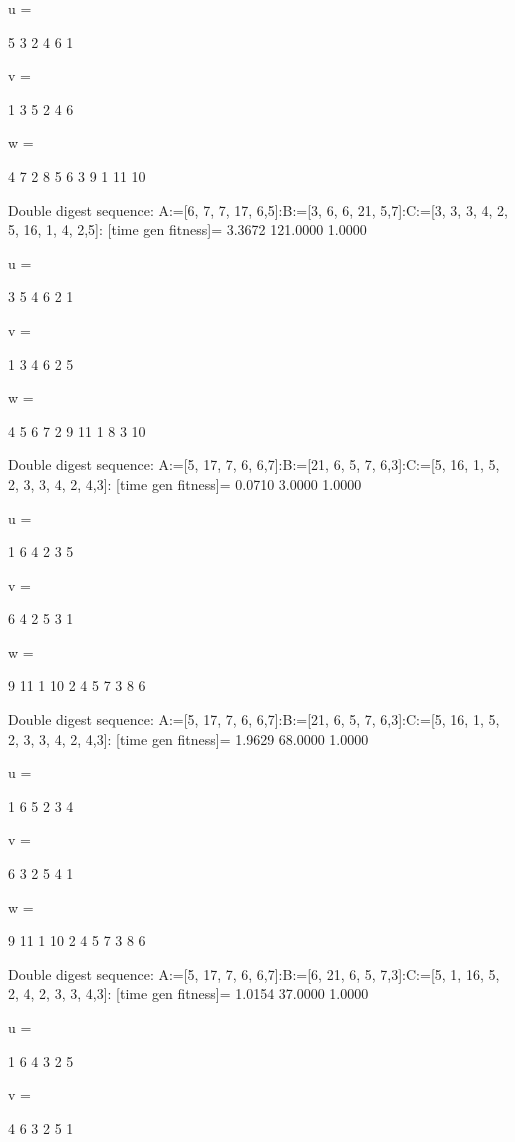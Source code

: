 u =

     5     3     2     4     6     1


v =

     1     3     5     2     4     6


w =

     4     7     2     8     5     6     3     9     1    11    10

Double digest sequence:
A:=[6, 7, 7, 17, 6,5]:B:=[3, 6, 6, 21, 5,7]:C:=[3, 3, 3, 4, 2, 5, 16, 1, 4, 2,5]:
[time gen fitness]=
    3.3672  121.0000    1.0000


u =

     3     5     4     6     2     1


v =

     1     3     4     6     2     5


w =

     4     5     6     7     2     9    11     1     8     3    10

Double digest sequence:
A:=[5, 17, 7, 6, 6,7]:B:=[21, 6, 5, 7, 6,3]:C:=[5, 16, 1, 5, 2, 3, 3, 4, 2, 4,3]:
[time gen fitness]=
    0.0710    3.0000    1.0000


u =

     1     6     4     2     3     5


v =

     6     4     2     5     3     1


w =

     9    11     1    10     2     4     5     7     3     8     6

Double digest sequence:
A:=[5, 17, 7, 6, 6,7]:B:=[21, 6, 5, 7, 6,3]:C:=[5, 16, 1, 5, 2, 3, 3, 4, 2, 4,3]:
[time gen fitness]=
    1.9629   68.0000    1.0000


u =

     1     6     5     2     3     4


v =

     6     3     2     5     4     1


w =

     9    11     1    10     2     4     5     7     3     8     6

Double digest sequence:
A:=[5, 17, 7, 6, 6,7]:B:=[6, 21, 6, 5, 7,3]:C:=[5, 1, 16, 5, 2, 4, 2, 3, 3, 4,3]:
[time gen fitness]=
    1.0154   37.0000    1.0000


u =

     1     6     4     3     2     5


v =

     4     6     3     2     5     1


